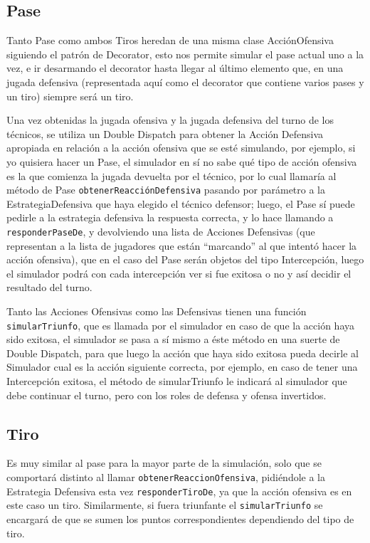 \subsection{Pase}

Tanto Pase como ambos Tiros heredan de una misma clase AcciónOfensiva siguiendo el patrón de Decorator, esto nos permite simular el pase actual uno a la vez, e ir desarmando el decorator hasta llegar al último elemento que, en una jugada defensiva (representada aquí como el decorator que contiene varios pases y un tiro) siempre será un tiro.

Una vez obtenidas la jugada ofensiva y la jugada defensiva del turno de los técnicos, se utiliza un Double Dispatch para obtener la Acción Defensiva apropiada en relación a la acción ofensiva que se esté simulando, por ejemplo, si yo quisiera hacer un Pase, el simulador en sí no sabe qué tipo de acción ofensiva es la que comienza la jugada devuelta por el técnico, por lo cual llamaría al método de Pase \texttt{obtenerReacciónDefensiva} pasando por parámetro a la EstrategiaDefensiva que haya elegido el técnico defensor; luego, el Pase sí puede pedirle a la estrategia defensiva la respuesta correcta, y lo hace llamando a \texttt{responderPaseDe}, y devolviendo una lista de Acciones Defensivas (que representan a la lista de jugadores que están ``marcando'' al que intentó hacer la acción ofensiva), que en el caso del Pase serán objetos del tipo Intercepción, luego el simulador podrá con cada intercepción ver si fue exitosa o no y así decidir el resultado del turno.

Tanto las Acciones Ofensivas como las Defensivas tienen una función \texttt{simularTriunfo}, que es llamada por el simulador en caso de que la acción haya sido exitosa, el simulador se pasa a sí mismo a éste método en una suerte de Double Dispatch, para que luego la acción que haya sido exitosa pueda decirle al Simulador cual es la acción siguiente correcta, por ejemplo, en caso de tener una Intercepción exitosa, el método de simularTriunfo le indicará al simulador que debe continuar el turno, pero con los roles de defensa y ofensa invertidos.


\subsection{Tiro}

Es muy similar al pase para la mayor parte de la simulación, solo que se comportará distinto al llamar \texttt{obtenerReaccionOfensiva}, pidiéndole a la Estrategia Defensiva esta vez \texttt{responderTiroDe}, ya que la acción ofensiva es en este caso un tiro. Similarmente, si fuera triunfante el \texttt{simularTriunfo} se encargará de que se sumen los puntos correspondientes dependiendo del tipo de tiro.

